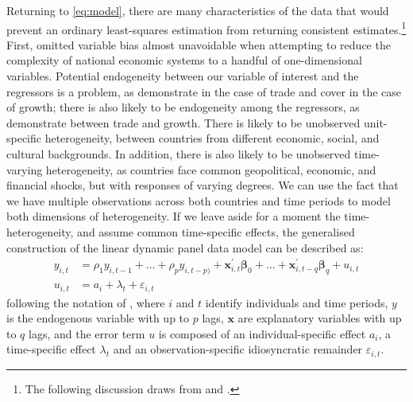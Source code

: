 \documentclass[12pt,a4paper]{article}
\begin{document}
Returning to \cref{eq:model}, there are many characteristics of the data that would prevent an ordinary least-squares estimation from returning consistent estimates.\footnote{
The following discussion draws from \cite{fritschGMMEstimationLinear2019} and \cite{rashidDynamicPanelData2018}.
}
First, omitted variable bias almost unavoidable when attempting to reduce the complexity of national economic systems to a handful of one-dimensional variables.
Potential endogeneity between our variable of interest and the regressors is a problem, as \cite{shahbazDynamicLinksEnergy2013} demonstrate in the case of trade and \cite{nayanRevisitingEnergyConsumption2013} cover in the case of growth; there is also likely to be endogeneity among the regressors, as \cite{rodriguezTradePolicyEconomic2001} demonstrate between trade and growth.
There is likely to be unobserved unit-specific heterogeneity, between countries from different economic, social, and cultural backgrounds.
In addition, there is also likely to be unobserved time-varying heterogeneity, as countries face common geopolitical, economic, and financial shocks, but with responses of varying degrees.
We can use the fact that we have multiple observations across both countries and time periods to model both dimensions of heterogeneity.
If we leave aside for a moment the time-heterogeneity, and assume common time-specific effects, the generalised construction of the linear dynamic panel data model can be described as:
\begin{align}
y_{i,t} &= \rho_1 y_{i,t-1} + \dots + \rho_p y_{i,t-p)} 
	+ \boldsymbol{x}^\prime_{i,t} \boldsymbol{\beta}_0 + \dots + \boldsymbol{x}^\prime_{i,t-q} \boldsymbol{\beta}_q 
	+ u_{i,t} \label{eq:panel} \\
u_{i,t} &= a_i + \lambda_t + \varepsilon_{i,t}
\end{align}
following the notation of \cite{fritschGMMEstimationLinear2019}, where $i$ and $t$ identify individuals and time periods, $y$ is the endogenous variable with up to $p$ lags, $\boldsymbol{x}$ are explanatory variables with up to $q$ lags, and the error term $u$ is composed of an individual-specific effect $a_i$, a time-specific effect $\lambda_t$ and an observation-specific  idiosyncratic remainder $\varepsilon_{i,t}$.
\end{document}
